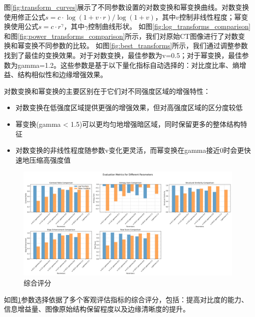 \documentclass[10.5pt]{config}
\begin{document}
图\ref{fig:transform_curves}展示了不同参数设置的对数变换和幂变换曲线。对数变换使用修正公式$s = c \cdot \log(1 + v \cdot r) / \log(1 + v)$，其中$v$控制非线性程度；幂变换使用公式$s = c \cdot r^{\gamma}$，其中$\gamma$控制曲线形状。
如图\ref{fig:log_transforms_comparison}和图\ref{fig:power_transforms_comparison}所示，我们对原始CT图像进行了对数变换和幂变换不同参数的比较。
如图\ref{fig:best_transforms}所示，我们通过调整参数找到了最佳的变换效果。对于对数变换，最佳参数为v=0.5；对于幂变换，最佳参数为gamma=1.2。这些参数是基于以下量化指标自动选择的：对比度比率、熵增益、结构相似性和边缘增强效果。

对数变换和幂变换的主要区别在于它们对不同强度区域的增强特性：
\begin{itemize}
    \item 对数变换在低强度区域提供更强的增强效果，但对高强度区域的区分度较低
    \item 幂变换(gamma < 1.5)可以更均匀地增强暗区域，同时保留更多的整体结构特征
    \item 对数变换的非线性程度随参数v变化更灵活，而幂变换在gamma接近0时会更快速地压缩高强度值
\end{itemize}
\begin{figure}[htbp]
    \centering
    \includegraphics[width=1.0\linewidth]{figures/CT_transform_metrics.png}
    \caption{综合评分}
    \label{fig:metrics}
\end{figure}

如图\ref{fig:metrics}参数选择依据了多个客观评估指标的综合评分，包括：提高对比度的能力、信息增益量、图像原始结构保留程度以及边缘清晰度的提升。
\end{document}
